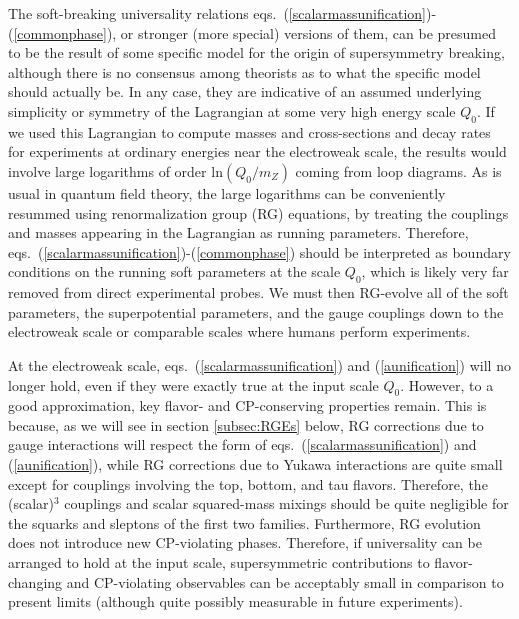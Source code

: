\documentclass[12pt]{article}
\begin{document}
The soft-breaking universality relations
eqs.~(\ref{scalarmassunification})-(\ref{commonphase}), or stronger (more
special) versions of them, can be presumed to be the result of some
specific model for the origin of supersymmetry breaking, although there is
no consensus among theorists as to what the specific model
should actually be. In any case, they are indicative of an assumed
underlying simplicity or symmetry of the Lagrangian at some very high
energy scale $Q_0$. If we used this Lagrangian to compute masses and
cross-sections and decay rates for experiments at ordinary energies near
the electroweak scale, the results would involve large logarithms of order
ln$(Q_0/m_Z)$ coming from loop diagrams. As is usual in quantum field
theory, the large logarithms can be conveniently resummed using
renormalization group (RG) equations, by treating the couplings and masses
appearing in the Lagrangian as running parameters. Therefore,
eqs.~(\ref{scalarmassunification})-(\ref{commonphase}) should be
interpreted as boundary conditions on the running soft parameters at the
scale $Q_0$, which is likely very far removed from direct experimental
probes. We must then RG-evolve all of the soft parameters, the
superpotential parameters, and the gauge couplings down to the electroweak
scale or comparable scales where humans perform experiments. 

At the electroweak scale, eqs.~(\ref{scalarmassunification}) and
(\ref{aunification}) will no longer hold, even if they were exactly true
at the input scale $Q_0$.  However, to a good approximation, key flavor-
and CP-conserving properties remain. This is because, as we will see in
section \ref{subsec:RGEs} below, RG corrections due to gauge interactions
will respect the form of
eqs.~(\ref{scalarmassunification}) and (\ref{aunification}),
while RG corrections due to Yukawa interactions are quite small except for
couplings involving the top, bottom, and tau flavors. Therefore, the
(scalar)$^3$ couplings and scalar squared-mass mixings should be quite
negligible for the squarks and sleptons of the first two families.
Furthermore, RG evolution does not introduce new CP-violating phases.
Therefore, if universality can be arranged to hold at the input scale,
supersymmetric contributions to flavor-changing and CP-violating
observables can be acceptably small in comparison to present limits
(although quite possibly measurable in future experiments). 
\end{document}

